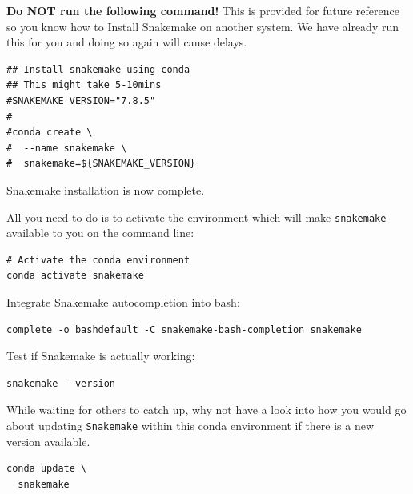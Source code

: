 \begin{warning}

\textbf{Do NOT run the following command!}
This is provided for future reference so you know how to Install Snakemake on another system.
We have already run this for you and doing so again will cause delays.

\begin{lstlisting}
## Install snakemake using conda
## This might take 5-10mins
#SNAKEMAKE_VERSION="7.8.5"
#
#conda create \
#  --name snakemake \
#  snakemake=${SNAKEMAKE_VERSION}
\end{lstlisting}

Snakemake installation is now complete.

\end{warning}

\begin{steps}

All you need to do is to activate the environment which will make \texttt{snakemake} available to you on the command line:

\begin{lstlisting}
# Activate the conda environment
conda activate snakemake
\end{lstlisting}

Integrate Snakemake autocompletion into bash:

\begin{lstlisting}
complete -o bashdefault -C snakemake-bash-completion snakemake
\end{lstlisting}

Test if Snakemake is actually working:

\begin{lstlisting}
snakemake --version
\end{lstlisting}

\end{steps}

\begin{bonus}

While waiting for others to catch up, why not have a look into how you would go about updating \texttt{Snakemake} within this conda environment if there is a new version available.

\begin{answer}
\begin{lstlisting}
conda update \
  snakemake
\end{lstlisting}
\end{answer}

\end{bonus}


